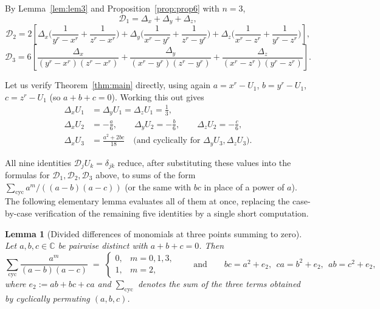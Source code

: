 \documentclass[11pt]{article}
\newtheorem{lemma}[theorem]{Lemma}
\theoremstyle{remark}
\newcommand{\CC}{\mathbb{C}}
\begin{document}
By Lemma~\ref{lem:lem3} and Proposition~\ref{prop:prop6} with $n=3$,
\[
\mathcal D_1=\Delta_x+\Delta_y+\Delta_z,
\]
\[
\mathcal D_2=2\left[\Delta_x\Big(\frac{1}{y^r-x^r}+\frac{1}{z^r-x^r}\Big)+\Delta_y\Big(\frac{1}{x^r-y^r}+\frac{1}{z^r-y^r}\Big)+\Delta_z\Big(\frac{1}{x^r-z^r}+\frac{1}{y^r-z^r}\Big)\right],
\]
\[
\mathcal D_3=6\left[\frac{\Delta_x}{(y^r-x^r)(z^r-x^r)}+\frac{\Delta_y}{(x^r-y^r)(z^r-y^r)}+\frac{\Delta_z}{(x^r-z^r)(y^r-z^r)}\right].
\]

Let us verify Theorem~\ref{thm:main} directly, using again $a=x^r-U_1$, $b=y^r-U_1$, $c=z^r-U_1$ (so $a+b+c=0$). Working this out gives
\begin{align*}
\Delta_xU_1&=\Delta_yU_1=\Delta_zU_1=\frac13,\\
\Delta_xU_2&=-\frac a6,\qquad \Delta_yU_2=-\frac b6,\qquad \Delta_zU_2=-\frac c6,\\
\Delta_xU_3&=\frac{a^2+2bc}{18}\quad\text{(and cyclically for }\Delta_yU_3,\Delta_zU_3\text{)}.
\end{align*}

All nine identities $\mathcal D_jU_k=\delta_{jk}$ reduce, after substituting these values into the formulas for $\mathcal D_1,\mathcal D_2,\mathcal D_3$ above, to sums of the form $\sum_{\mathrm{cyc}}a^m/((a-b)(a-c))$ (or the same with $bc$ in place of a power of $a$). The following elementary lemma evaluates all of them at once, replacing the case-by-case verification of the remaining five identities by a single short computation.

\begin{lemma}[Divided differences of monomials at three points summing to zero]\label{lem:divdiff}
Let $a,b,c\in\CC$ be pairwise distinct with $a+b+c=0$. Then
\[
\sum_{\mathrm{cyc}}\frac{a^m}{(a-b)(a-c)} \;=\; \begin{cases} 0, & m=0,1,3,\\ 1, & m=2,\end{cases} \qquad\text{and}\qquad bc=a^2+e_2,\ \ ca=b^2+e_2,\ \ ab=c^2+e_2,
\]
where $e_2:=ab+bc+ca$ and $\sum_{\mathrm{cyc}}$ denotes the sum of the three terms obtained by cyclically permuting $(a,b,c)$.
\end{lemma}
\end{document}
